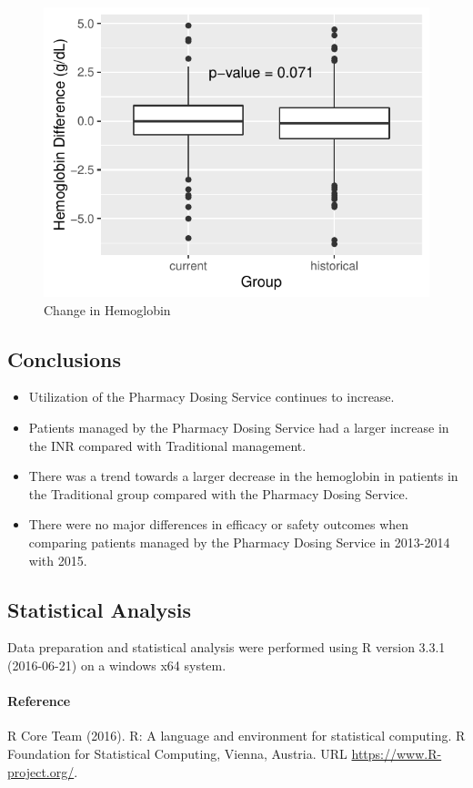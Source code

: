 \documentclass[]{article}
\providecommand{\tightlist}{%
  \setlength{\itemsep}{0pt}\setlength{\parskip}{0pt}}
\let\oldparagraph\paragraph
\renewcommand{\paragraph}[1]{\oldparagraph{#1}\mbox{}}
\begin{document}
\begin{figure}[H]
\centering
\includegraphics{warfarin_analysis_2015_files/figure-latex/hgb2_hist-1.pdf}
\caption{Change in Hemoglobin}
\end{figure}

\subsection{Conclusions}\label{conclusions}

\begin{itemize}
\tightlist
\item
  Utilization of the Pharmacy Dosing Service continues to increase.
\item
  Patients managed by the Pharmacy Dosing Service had a larger increase
  in the INR compared with Traditional management.
\item
  There was a trend towards a larger decrease in the hemoglobin in
  patients in the Traditional group compared with the Pharmacy Dosing
  Service.
\item
  There were no major differences in efficacy or safety outcomes when
  comparing patients managed by the Pharmacy Dosing Service in 2013-2014
  with 2015.
\end{itemize}

\subsection{Statistical Analysis}\label{statistical-analysis}

Data preparation and statistical analysis were performed using R version
3.3.1 (2016-06-21) on a windows x64 system.

\paragraph{Reference}\label{reference}

R Core Team (2016). R: A language and environment for statistical
computing. R Foundation for Statistical Computing, Vienna, Austria. URL
\url{https://www.R-project.org/}.
\end{document}
